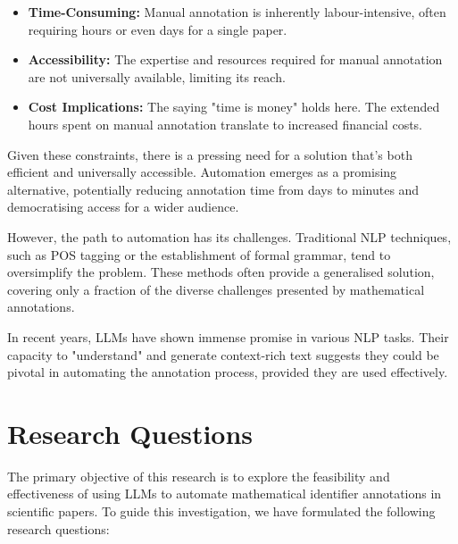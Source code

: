 \begin{itemize}
    \item \textbf{Time-Consuming:} Manual annotation is inherently labour-intensive, often requiring hours or even days for a single paper.
    
    \item \textbf{Accessibility:} The expertise and resources required for manual annotation are not universally available, limiting its reach.
    
    \item \textbf{Cost Implications:} The saying "time is money" holds here. The extended hours spent on manual annotation translate to increased financial costs.
\end{itemize}

Given these constraints, there is a pressing need for a solution that's both efficient and universally accessible. Automation emerges as a promising alternative, potentially reducing annotation time from days to minutes and democratising access for a wider audience.

However, the path to automation has its challenges. Traditional \ac{NLP} techniques, such as \ac{POS} tagging or the establishment of formal grammar, tend to oversimplify the problem. These methods often provide a generalised solution, covering only a fraction of the diverse challenges presented by mathematical annotations. 

In recent years, LLMs have shown immense promise in various NLP tasks. Their capacity to "understand" and generate context-rich text suggests they could be pivotal in automating the annotation process, provided they are used effectively.

\section{Research Questions}

The primary objective of this research is to explore the feasibility and effectiveness of using LLMs to automate mathematical identifier annotations in scientific papers. To guide this investigation, we have formulated the following research questions:

